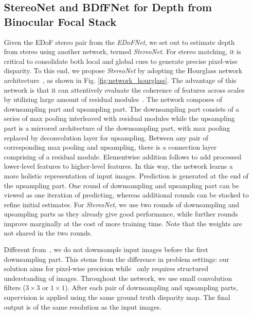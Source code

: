 \documentclass[10pt,twocolumn,letterpaper]{article}
\begin{document}
\subsection{StereoNet and BDfFNet for Depth from Binocular Focal Stack}
\label{section:stereo}
Given the EDoF stereo pair from the \emph{EDoFNet}, we set out to estimate depth from stereo using another network, termed \emph{StereoNet}. For stereo matching, it is critical to consolidate both local and global cues to generate precise pixel-wise disparity.
To this end, we propose \emph{StereoNet} by adopting the Hourglass network architecture~\cite{newell16}, as shown in Fig. \ref{fig:network_hourglass}. The advantage of this network is that it can attentively evaluate the coherence of features across scales by utilizing large amount of residual modules~\cite{he2016deep}. The network composes of downsampling part and upsampling part. The downsampling part consists of a series of max pooling interleaved with residual modules while the upsampling part is a mirrored architecture of the downsampling part, with max pooling replaced by deconvolution layer for upsampling. Between any pair of corresponding max pooling and upsampling, there is a connection layer comprising of a residual module. Elementwise addition follows to add processed lower-level features to higher-level features. In this way, the network learns a more holistic representation of input images. Prediction is generated at the end of the upsampling part. One round of downsampling and upsampling part can be viewed as one iteration of predicting, whereas additional rounds can be stacked to refine initial estimates. For \emph{StereoNet}, we use two rounds of downsampling and upsampling parts as they already give good performance, while further rounds improve marginally at the cost of more training time. Note that the weights are not shared in the two rounds.

Different from~\cite{newell16}, we do not downsample input images before the first downsampling part. This stems from the difference in problem settings: our solution aims for pixel-wise precision while~\cite{newell16} only requires structured understanding of images. Throughout the network, we use small convolution filters ($3\times3$ or $1\times1$). After each pair of downsampling and upsampling parts, supervision is applied using the same ground truth disparity map. The final output is of the same resolution as the input images.
\end{document}
